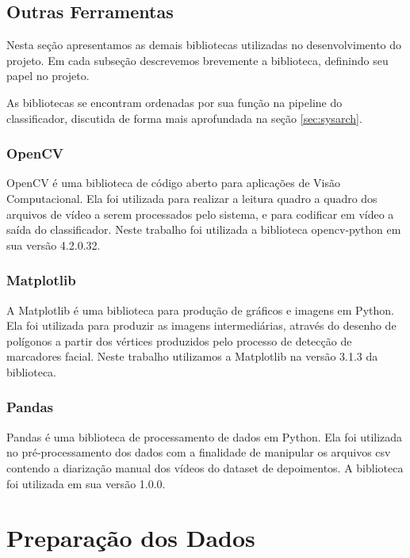 \subsection{Outras Ferramentas}
\label{subsec:otools}

Nesta seção apresentamos as demais bibliotecas utilizadas no desenvolvimento do projeto. Em cada subseção descrevemos brevemente a biblioteca, definindo seu papel no projeto.

As bibliotecas se encontram ordenadas por sua função na pipeline do classificador, discutida de forma mais aprofundada na seção \ref{sec:sysarch}.

\subsubsection{OpenCV}

OpenCV\cite{opencv_library} é uma biblioteca de código aberto para aplicações de Visão Computacional.
Ela foi utilizada para realizar a leitura quadro a quadro dos arquivos de vídeo a serem processados pelo sistema, e para codificar em vídeo a saída do classificador.
Neste trabalho foi utilizada a biblioteca opencv-python em sua versão 4.2.0.32.

\subsubsection{Matplotlib}

A Matplotlib\cite{hunterMatplotlib2DGraphics2007} é uma biblioteca para produção de gráficos e imagens em Python.
Ela foi utilizada para produzir as imagens intermediárias, através do desenho de polígonos a partir dos vértices produzidos pelo processo de detecção de marcadores facial.
Neste trabalho utilizamos a Matplotlib na versão 3.1.3 da biblioteca.

\subsubsection{Pandas}

Pandas\cite{mckinney-proc-scipy-2010} é uma biblioteca de processamento de dados em Python.
Ela foi utilizada no pré-processamento dos dados com a finalidade de manipular os arquivos csv contendo a diarização manual dos vídeos do dataset de depoimentos.
A biblioteca foi utilizada em sua versão 1.0.0.

\section{Preparação dos Dados}
\label{sec:preproc}


